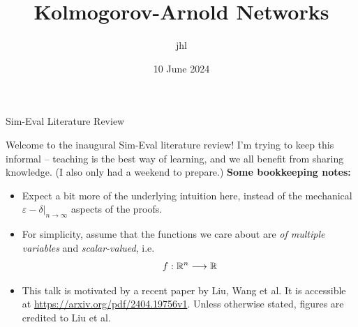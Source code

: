 




\title{Kolmogorov-Arnold Networks}
\author{jhl}
\date{10 June 2024}



{
\begin{frame}{}
    {\center Sim-Eval Literature Review}
    \titlepage
\end{frame}
}

\addtocounter{framenumber}{-1}

\begin{frame}{Welcome to the inaugural Sim-Eval literature review!} 
    I'm trying to keep this informal -- teaching is the best way of learning,
    and we all benefit from sharing knowledge. (I also only had a weekend to prepare.) 
    \textbf{Some bookkeeping notes:}
    \begin{itemize}
        \item Expect a bit more of the underlying intuition here, instead of the mechanical
            $\varepsilon-\delta|_{n \to \infty}$ aspects of the proofs.
        \item For simplicity, assume that the functions we care about are
            \textit{of multiple variables} and \textit{scalar-valued}, i.e. 
            \[
                f: \mathbb{R}^n \longrightarrow \mathbb{R}
            \]
        \item This talk is motivated by a recent paper by Liu, Wang et al. It is accessible
         at \url{https://arxiv.org/pdf/2404.19756v1}. Unless otherwise stated, 
         figures are credited to Liu et al.
    \end{itemize}
\end{frame}

